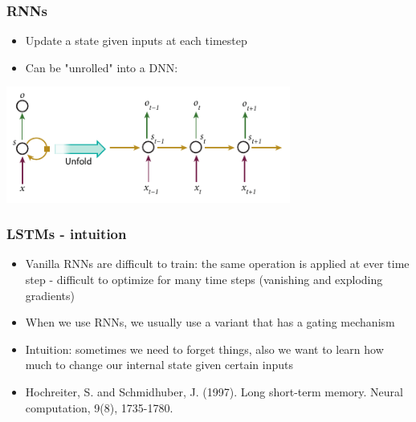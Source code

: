 \documentclass{beamer}
\begin{document}
\begin{frame}[fragile]
\frametitle{RNNs}
  \begin{itemize}
  	\item Update a state given inputs at each timestep
  	\item Can be "unrolled" into a DNN:
  \end{itemize}
  \begin{center}
  	\includegraphics[width=0.7\textwidth]{05_RNN_schema_unfold}
  \end{center}
\end{frame}

\begin{frame}[fragile]
\frametitle{LSTMs - intuition}
  \begin{itemize}
  	\item Vanilla RNNs are difficult to train: the same operation is applied at ever time step - difficult to optimize for many time steps (vanishing and exploding gradients)
	\item When we use RNNs, we usually use a variant that has a gating mechanism
	\item Intuition: sometimes we need to forget things, also we want to learn how much to change our internal state given certain inputs
	\item Hochreiter, S. and Schmidhuber, J. (1997). Long short-term memory. Neural computation, 9(8), 1735-1780.
  \end{itemize}
\end{frame}

\end{document}
